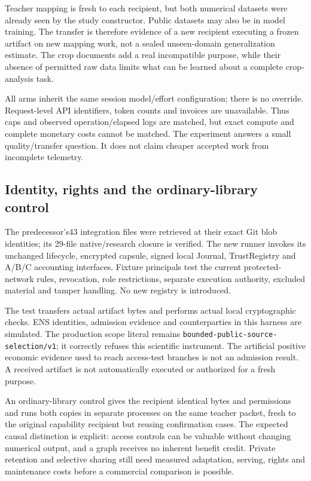 Teacher mapping is fresh to each recipient, but both numerical datasets were already seen by the study constructor. Public datasets may also be in model training. The transfer is therefore evidence of a new recipient executing a frozen artifact on new mapping work, not a sealed unseen-domain generalization estimate. The crop documents add a real incompatible purpose, while their absence of permitted raw data limits what can be learned about a complete crop-analysis task.

All arms inherit the same session model/effort configuration; there is no override. Request-level API identifiers, token counts and invoices are unavailable. Thus caps and observed operation/elapsed logs are matched, but exact compute and complete monetary costs cannot be matched. The experiment answers a small quality/transfer question. It does not claim cheaper accepted work from incomplete telemetry.

\subsection{Identity, rights and the ordinary-library control}

The predecessor's43 integration files were retrieved at their exact Git blob identities; its 29-file native/research closure is verified. The new runner invokes its unchanged lifecycle, encrypted capsule, signed local Journal, TrustRegistry and A/B/C accounting interfaces. Fixture principals test the current protected-network rules, revocation, role restrictions, separate execution authority, excluded material and tamper handling. No new registry is introduced.

The test transfers actual artifact bytes and performs actual local cryptographic checks. ENS identities, admission evidence and counterparties in this harness are simulated. The production scope literal remains \texttt{bounded-public-source-selection/v1}; it correctly refuses this scientific instrument. The artificial positive economic evidence used to reach access-test branches is not an admission result. A received artifact is not automatically executed or authorized for a fresh purpose.

An ordinary-library control gives the recipient identical bytes and permissions and runs both copies in separate processes on the same teacher packet, fresh to the original capability recipient but reusing confirmation cases. The expected causal distinction is explicit: access controls can be valuable without changing numerical output, and a graph receives no inherent benefit credit. Private retention and selective sharing still need measured adaptation, serving, rights and maintenance costs before a commercial comparison is possible.

